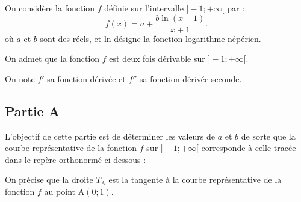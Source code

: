 On considère la fonction $f$ définie sur l'intervalle $]-1 ;+\infty[$ par :
	\[f(x)=a+\dfrac{b \ln (x+1)}{x+1}.\]
	où $a$ et $b$ sont des réels, et ln désigne la fonction logarithme népérien.

	On admet que la fonction $f$ est deux fois dérivable sur $]-1 ; +\infty [$.

	On note $f'$ sa fonction dérivée et $f''$ sa fonction dérivée seconde.

	\subsection*{Partie A}
	L'objectif de cette partie est de déterminer les valeurs de $a$ et $b$ de sorte que la courbe représentative de la fonction $f$ sur $]-1 ;+\infty[$ 
	corresponde à celle tracée dans le repère orthonormé ci-dessous :

	\begin{center}
		













	\end{center}


	On précise que la droite $T_{\mathrm{A}}$ est la tangente à la courbe représentative de la fonction $f$ au point A$(0 ; 1)$.


